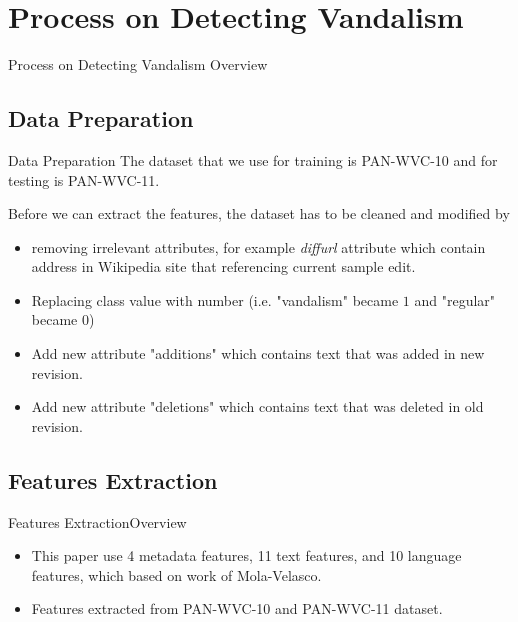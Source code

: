 \documentclass{beamer}
\begin{document}

\section{Process on Detecting Vandalism}

\begin{frame}
	\begin{multicols}{2}
		\tableofcontents[currentsection]
	\end{multicols}
\end{frame}

\begin{frame}
	{Process on Detecting Vandalism}
	{Overview}
	
\end{frame}

\subsection{Data Preparation}

\begin{frame}{Data Preparation}
	The dataset that we use for training is PAN-WVC-10 and for
	testing is PAN-WVC-11.

	Before we can extract the features, the dataset has to be cleaned and
	modified by
	\begin{itemize}
	\item removing irrelevant attributes, for example \textit{diffurl}
	attribute which contain address in Wikipedia site that referencing current
	sample edit.
	\item Replacing class value with number (i.e. "vandalism" became $1$
	and "regular" became $0$)
	\item Add new attribute "additions" which contains text that was added in
	new revision.
	\item Add new attribute "deletions" which contains text that was deleted in
	old revision.
	\end{itemize}
\end{frame}

\subsection{Features Extraction}

\begin{frame}{Features Extraction}{Overview}
	\begin{itemize}
	\item This paper use 4 metadata features, 11 text features, and 10 language
	features, which based on work of Mola-Velasco.
	\item Features extracted from PAN-WVC-10 and PAN-WVC-11 dataset.
	\end{itemize}
\end{frame}
\end{document}
